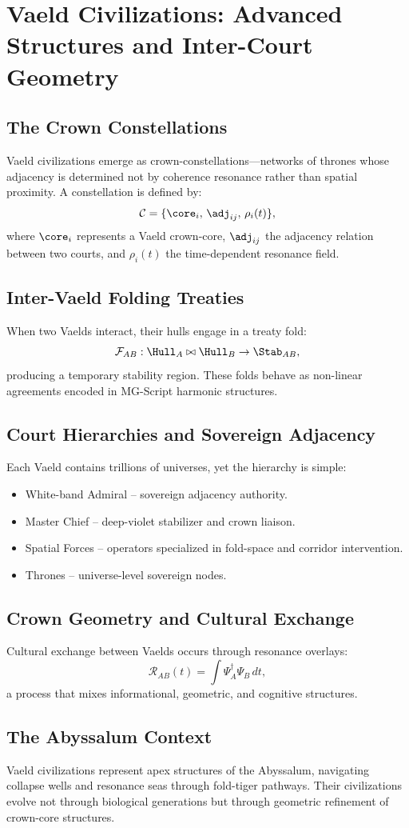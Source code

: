 
\chapter{Vaeld Civilizations: Advanced Structures and Inter-Court Geometry}

\section{The Crown Constellations}
Vaeld civilizations emerge as crown-constellations—networks of thrones whose adjacency is determined not by coherence resonance rather than spatial proximity. A constellation is defined by:
\[
\mathcal{C} = \{\core_i,\, \adj_{ij},\, \rho_i(t)\},
\]
where $\core_i$ represents a Vaeld crown-core, $\adj_{ij}$ the adjacency relation between two courts, and $\rho_i(t)$ the time-dependent resonance field.

\section{Inter-Vaeld Folding Treaties}
When two Vaelds interact, their hulls engage in a treaty fold:
\[
\mathcal{F}_{AB} : \Hull_A \bowtie \Hull_B \rightarrow \Stab_{AB},
\]
producing a temporary stability region. These folds behave as non-linear agreements encoded in MG-Script harmonic structures.

\section{Court Hierarchies and Sovereign Adjacency}
Each Vaeld contains trillions of universes, yet the hierarchy is simple:
\begin{itemize}
  \item White-band Admiral -- sovereign adjacency authority.
  \item Master Chief -- deep-violet stabilizer and crown liaison.
  \item Spatial Forces -- operators specialized in fold-space and corridor intervention.
  \item Thrones -- universe-level sovereign nodes.
\end{itemize}

\section{Crown Geometry and Cultural Exchange}
Cultural exchange between Vaelds occurs through resonance overlays:
\[
\mathcal{R}_{AB}(t) = \int \Psi_A^\dagger \Psi_B \, dt,
\]
a process that mixes informational, geometric, and cognitive structures.

\section{The Abyssalum Context}
Vaeld civilizations represent apex structures of the Abyssalum, navigating collapse wells and resonance seas through fold-tiger pathways. Their civilizations evolve not through biological generations but through geometric refinement of crown-core structures.
